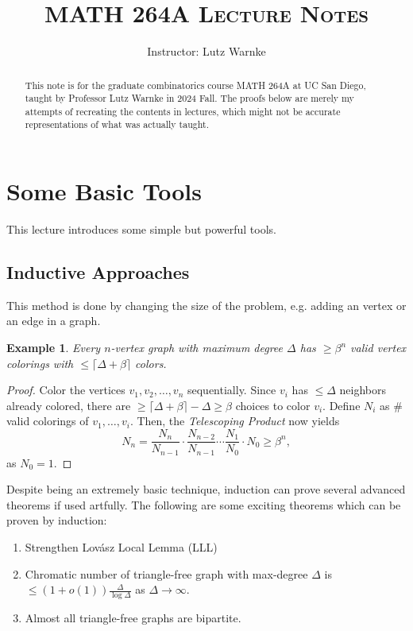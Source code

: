 \documentclass[a4paper]{article}
\title{\textsc{MATH 264A Lecture Notes}}
\author{Instructor: Lutz Warnke}
\date{}
\newtheorem{example}[theorem]{Example}
\begin{document}
\maketitle

\begin{abstract}
  This note is for the graduate combinatorics course MATH 264A at UC San Diego, taught by Professor
  Lutz Warnke in 2024 Fall. The proofs below are merely my attempts of recreating the contents in
  lectures, which might not be accurate representations of what was actually taught. 
\end{abstract}

\section{Some Basic Tools}

This lecture introduces some simple but powerful tools.

\subsection*{Inductive Approaches}

This method is done by changing the size of the problem, e.g. adding an vertex or an edge in a
graph.

\begin{example}
  Every $n$-vertex graph with maximum degree $\Delta$ has $\geq \beta^n$ valid vertex colorings with
  $\leq \lceil \Delta + \beta \rceil$ colors.
\end{example}

\begin{proof}
  Color the vertices $v_1, v_2, \ldots, v_n$ sequentially. Since $v_i$ has $\leq \Delta$ neighbors
  already colored, there are $\geq \lceil \Delta + \beta \rceil - \Delta \geq \beta$ choices to
  color $v_i$. Define $N_i$ as $\#$ valid colorings of $v_1, \ldots, v_i$. Then, the
  \textit{Telescoping Product} now yields
  \[
    N_n = \frac{N_n}{N_{n - 1}} \cdot \frac{N_{n - 2}}{N_{n - 1}} \cdots \frac{N_{1}}{N_{0}} \cdot N_0 \geq \beta^n,
  \]
  as $N_0 = 1$.
\end{proof}

Despite being an extremely basic technique, induction can prove several advanced theorems if used
artfully. The following are some exciting theorems which can be proven by induction:

\begin{enumerate}
  \item Strengthen Lovász Local Lemma (LLL)
  \item Chromatic number of triangle-free graph with max-degree $\Delta$ is $\leq (1 +
  o(1))\frac{\Delta}{\log \Delta}$ as $\Delta \to \infty$.
  \item Almost all triangle-free graphs are bipartite.
\end{enumerate}
\end{document}
